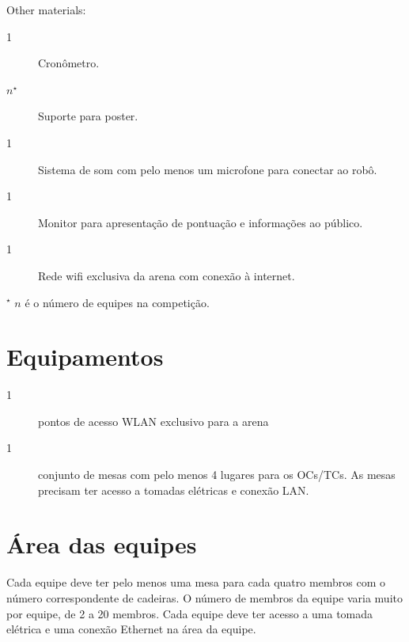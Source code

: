 \documentclass[11pt, twoside, openright, a4paper, chapterprefix]{article}
\begin{document}

Other materials:
\begin{description}
    \item [1] Cronômetro.
    \item [$n$${}^\star$] Suporte para poster.
    \item [1] Sistema de som com pelo menos um microfone para conectar ao robô.
    \item [1] Monitor para apresentação de pontuação e informações ao público.
    \item [1] Rede wifi exclusiva da arena com conexão à internet.
\end{description}
${}^\star$ $n$ é o número de equipes na competição.

\section{Equipamentos}
\begin{description}
    \item [1] pontos de acesso WLAN exclusivo para a arena
    \item [1] conjunto de mesas com pelo menos 4 lugares para os OCs/TCs. As mesas precisam ter acesso a tomadas elétricas e conexão LAN.
\end{description}
    
\section{Área das equipes}
Cada equipe deve ter pelo menos uma mesa para cada quatro membros com o número correspondente de cadeiras. O número de membros da equipe varia muito por equipe, de 2 a 20 membros. Cada equipe deve ter acesso a uma tomada elétrica e uma conexão Ethernet na área da equipe.
\end{document}
